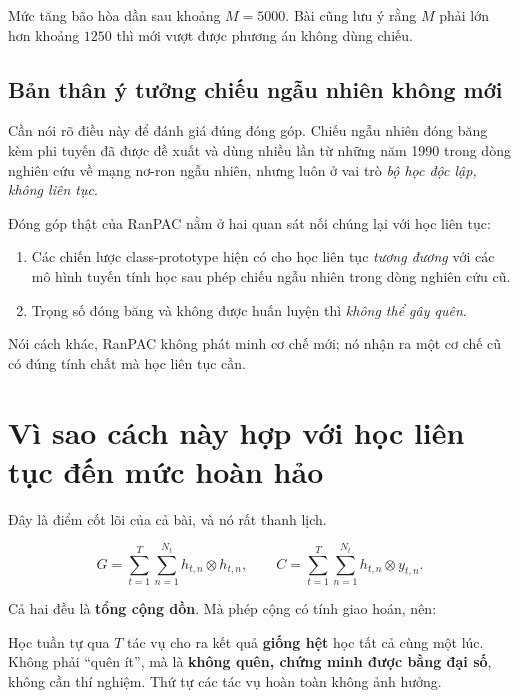 \documentclass[11pt,a4paper]{article}
\newenvironment{luuy}{\begin{leftbar}\noindent\ignorespaces}{\end{leftbar}}
\begin{document}
Mức tăng bão hòa dần sau khoảng $M = 5000$. Bài cũng lưu ý rằng $M$ phải lớn hơn
khoảng $1250$ thì mới vượt được phương án không dùng chiếu.

\subsection{Bản thân ý tưởng chiếu ngẫu nhiên không mới}

Cần nói rõ điều này để đánh giá đúng đóng góp. Chiếu ngẫu nhiên đóng băng kèm phi
tuyến đã được đề xuất và dùng nhiều lần từ những năm 1990 trong dòng nghiên cứu
về mạng nơ-ron ngẫu nhiên, nhưng luôn ở vai trò \emph{bộ học độc lập, không liên
tục}.

Đóng góp thật của RanPAC nằm ở hai quan sát nối chúng lại với học liên tục:

\begin{enumerate}[leftmargin=*]
\item Các chiến lược class-prototype hiện có cho học liên tục \emph{tương đương}
      với các mô hình tuyến tính học sau phép chiếu ngẫu nhiên trong dòng nghiên
      cứu cũ.
\item Trọng số đóng băng và không được huấn luyện thì \emph{không thể gây quên}.
\end{enumerate}

Nói cách khác, RanPAC không phát minh cơ chế mới; nó nhận ra một cơ chế cũ có
đúng tính chất mà học liên tục cần.

\section{Vì sao cách này hợp với học liên tục đến mức hoàn hảo}
\label{sec:coloi}

Đây là điểm cốt lõi của cả bài, và nó rất thanh lịch.

\begin{equation}
G = \sum_{t=1}^{T}\sum_{n=1}^{N_t} h_{t,n} \otimes h_{t,n},
\qquad
C = \sum_{t=1}^{T}\sum_{n=1}^{N_t} h_{t,n} \otimes y_{t,n}.
\label{eq:congdon}
\end{equation}

Cả hai đều là \textbf{tổng cộng dồn}. Mà phép cộng có tính giao hoán, nên:

\begin{luuy}
Học tuần tự qua $T$ tác vụ cho ra kết quả \textbf{giống hệt} học tất cả cùng một
lúc. Không phải ``quên ít'', mà là \textbf{không quên, chứng minh được bằng đại
số}, không cần thí nghiệm. Thứ tự các tác vụ hoàn toàn không ảnh hưởng.
\end{luuy}
\end{document}
